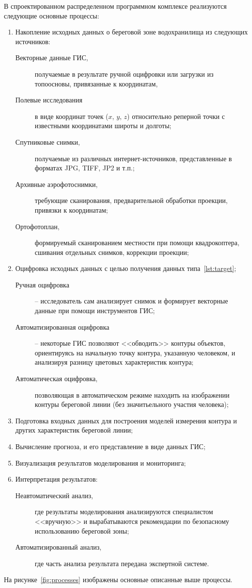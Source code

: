 \documentclass[732,14pt,final]{studrep}
\begin{document}
В спроектированном распределенном программном комплексе реализуются следующие основные процессы:
\begin{enumerate}
  \item Накопление исходных данных о береговой зоне водохранилища из следующих источников:
  \begin{description}
    \item [Векторные данные ГИС,] получаемые в результате ручной оцифровки или загрузки из топоосновы, привязанные к координатам, \label{lst:target}
    \item [Полевые исследования] в виде координат точек ($x$, $y$, $z$) относительно реперной точки с известными координатами широты и долготы;
    \item [Спутниковые снимки,] получаемые из различных интернет-источников, представленные в форматах JPG, TIFF, JP2 и т.п.;
    \item [Архивные аэрофотоснимки,] требующие сканирования, предварительной обработки проекции, привязки к координатам;
    \item [Ортофотоплан,] формируемый сканированием местности при помощи квадрокоптера, сшивания отдельных снимков, коррекции проекции;
  \end{description}
  \item Оцифровка исходных данных с целью получения данных типа~\ref{lst:target};
  \begin{description}
    \item[Ручная оцифровка] -- исследователь сам анализирует снимок и формирует векторные данные при помощи инструментов ГИС;
    \item[Автоматизированная оцифровка] -- некоторые ГИС позволяют <<обводить>> контуры объектов, ориентируясь на начальную точку контура, указанную человеком, и анализируя разницу цветовых характеристик контура;
    \item[Автоматическая оцифровка,] позволяющая в автоматическом режиме находить на изображении контуры береговой линии (без значитьельного участия человека);
  \end{description}
  \item Подготовка входных данных для построения моделей измерения контура и других характеристик береговой линии;
  \item Вычисление прогноза, и его представление в виде данных ГИС;
  \item Визуализация результатов моделирования и мониторинга;
  \item Интерпретация результатов:
  \begin{description}
    \item[Неавтоматический анализ,] где результаты моделирования анализируются специалистом <<вручную>> и вырабатываются рекомендации по безопасному использованию береговой зоны;
    \item[Автоматизированный анализ,] где часть анализа результата передана экспертной системе.
  \end{description}
\end{enumerate}
На рисунке~\ref{fig:processes} изображены основные описанные выше процессы.
\end{document}
